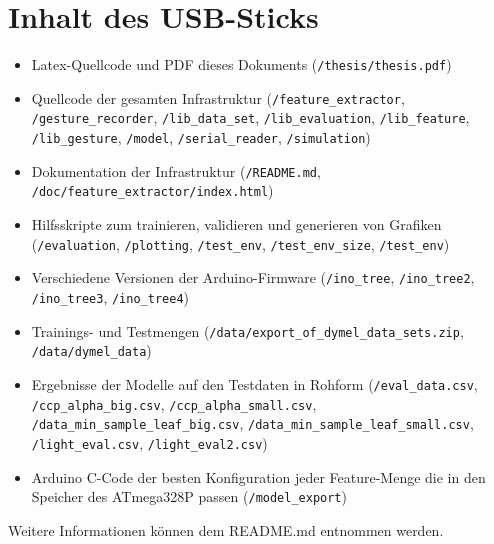 \chapter{Inhalt des USB-Sticks}
\begin{itemize}
    \item Latex-Quellcode und PDF dieses Dokuments (\texttt{/thesis/thesis.pdf})
    \item Quellcode der gesamten Infrastruktur (\texttt{/feature\_extractor}, \texttt{/gesture\_recorder}, \texttt{/lib\_data\_set}, \texttt{/lib\_evaluation}, \texttt{/lib\_feature}, \texttt{/lib\_gesture}, \texttt{/model}, \texttt{/serial\_reader}, \texttt{/simulation})
    \item Dokumentation der Infrastruktur (\texttt{/README.md}, \\\texttt{/doc/feature\_extractor/index.html})
    \item Hilfsskripte zum trainieren, validieren und generieren von Grafiken (\texttt{/evaluation}, \texttt{/plotting}, \texttt{/test\_env}, \texttt{/test\_env\_size}, \texttt{/test\_env})
    \item Verschiedene Versionen der Arduino-Firmware (\texttt{/ino\_tree}, \texttt{/ino\_tree2}, \\\texttt{/ino\_tree3}, \texttt{/ino\_tree4})
    \item Trainings- und Testmengen (\texttt{/data/export\_of\_dymel\_data\_sets.zip}, \\\texttt{/data/dymel\_data})
    \item Ergebnisse der Modelle auf den Testdaten in Rohform (\texttt{/eval\_data.csv}, \\\texttt{/ccp\_alpha\_big.csv}, \texttt{/ccp\_alpha\_small.csv}, \\\texttt{/data\_min\_sample\_leaf\_big.csv}, \texttt{/data\_min\_sample\_leaf\_small.csv}, \texttt{/light\_eval.csv}, \texttt{/light\_eval2.csv})
    \item Arduino C-Code der besten Konfiguration jeder Feature-Menge die in den Speicher des ATmega328P passen (\texttt{/model\_export})
\end{itemize}
Weitere Informationen können dem README.md entnommen werden.